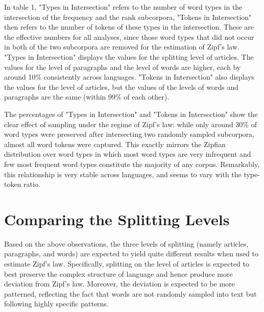 \documentclass{article}
\begin{document}
In table 1, "Types in Intersection" refers to the number of word types in the intersection of the frequency and the rank subcorpora, "Tokens in Intersection" then refers to the number of tokens of these types in the intersection. These are the effective numbers for all analyses, since those word types that did not occur in both of the two subcorpora are removed for the estimation of Zipf's law. "Types in Intersection" displays the values for the splitting level of articles. The values for the level of paragraphs and the level of words are higher, each by around 10\% consistently across languages. "Tokens in Intersection" also displays the values for the level of articles, but the values of the levels of words and paragraphs are the same (within 99\% of each other).

The percentages of "Types in Intersection" and "Tokens in Intersection" show the clear effect of sampling under the regime of Zipf's law: while only around 30\% of word types were preserved after intersecting two randomly sampled subcorpora, almost all word tokens were captured. This exactly mirrors the Zipfian distribution over word types in which most word types are very infrequent and few most frequent word types constitute the majority of any corpus. Remarkably, this relationship is very stable across languages, and seems to vary with the type-token ratio.




\section{Comparing the Splitting Levels}

Based on the above observations, the three levels of splitting (namely articles, paragraphs, and words) are expected to yield quite different results when used to estimate Zipf's law. Specifically, splitting on the level of articles is expected to best preserve the complex structure of language and hence produce more deviation from Zipf's law. Moreover, the deviation is expected to be more patterned, reflecting the fact that words are not randomly sampled into text but following highly specific patterns.\\
\end{document}
